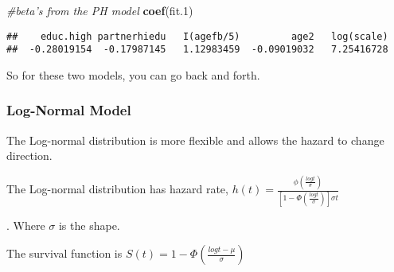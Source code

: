 \documentclass[
]{article}
\newenvironment{Shaded}{\begin{snugshade}}{\end{snugshade}}
\newcommand{\CommentTok}[1]{\textcolor[rgb]{0.56,0.35,0.01}{\textit{#1}}}
\newcommand{\DataTypeTok}[1]{\textcolor[rgb]{0.13,0.29,0.53}{#1}}
\newcommand{\DecValTok}[1]{\textcolor[rgb]{0.00,0.00,0.81}{#1}}
\newcommand{\FloatTok}[1]{\textcolor[rgb]{0.00,0.00,0.81}{#1}}
\newcommand{\KeywordTok}[1]{\textcolor[rgb]{0.13,0.29,0.53}{\textbf{#1}}}
\newcommand{\NormalTok}[1]{#1}
\newcommand{\OperatorTok}[1]{\textcolor[rgb]{0.81,0.36,0.00}{\textbf{#1}}}
\newcommand{\StringTok}[1]{\textcolor[rgb]{0.31,0.60,0.02}{#1}}
\begin{document}
\begin{Shaded}
\begin{Highlighting}[]
\CommentTok{#beta's from the PH model}
\KeywordTok{coef}\NormalTok{(fit}\FloatTok{.1}\NormalTok{)}
\end{Highlighting}
\end{Shaded}

\begin{verbatim}
##    educ.high partnerhiedu   I(agefb/5)         age2   log(scale) 
##  -0.28019154  -0.17987145   1.12983459  -0.09019032   7.25416728
\end{verbatim}

So for these two models, you can go back and forth.

\hypertarget{log-normal-model}{%
\subsubsection{Log-Normal Model}\label{log-normal-model}}

The Log-normal distribution is more flexible and allows the hazard to
change direction.

The Log-normal distribution has hazard rate,
\(h(t) = \frac{\phi \left (\frac{log t}{\sigma} \right ) }{\left [ 1 - \Phi \left ( \frac{log t}{\sigma} \right ) \right ] \sigma t}\)

. Where \(\sigma\) is the shape.

The survival function is
\(S(t) = 1 - \Phi \left ( \frac{log t - \mu}{\sigma} \right )\)

\begin{Shaded}
\end{Shaded}
\end{document}
